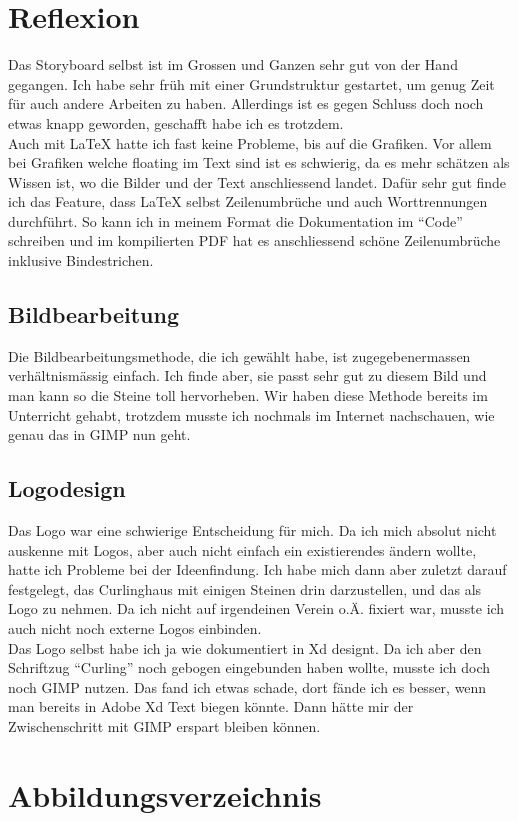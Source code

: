 \documentclass[11pt]{article}
\begin{document}
    \section{Reflexion}
    Das Storyboard selbst ist im Grossen und Ganzen sehr gut von der Hand gegangen. Ich habe sehr früh mit einer
    Grundstruktur gestartet, um genug Zeit für auch andere Arbeiten zu haben. Allerdings ist es gegen Schluss doch
    noch etwas knapp geworden, geschafft habe ich es trotzdem. \smiley
    \\Auch mit \LaTeX\xspace hatte ich fast keine Probleme, bis auf die Grafiken. Vor allem bei Grafiken welche floating
    im Text sind ist es schwierig, da es mehr schätzen als Wissen ist, wo die Bilder und der Text anschliessend
    landet. Dafür sehr gut finde ich das Feature, dass \LaTeX\xspace selbst Zeilenumbrüche und auch Worttrennungen
    durchführt. So kann ich in meinem Format die Dokumentation im ``Code'' schreiben und im kompilierten PDF hat es
    anschliessend schöne Zeilenumbrüche inklusive Bindestrichen.

    \subsection{Bildbearbeitung}
    Die Bildbearbeitungsmethode, die ich gewählt habe, ist zugegebenermassen verhältnismässig einfach. Ich finde aber,
    sie passt sehr gut zu diesem Bild und man kann so die Steine toll hervorheben. Wir haben diese Methode bereits im
    Unterricht gehabt, trotzdem musste ich nochmals im Internet nachschauen, wie genau das in GIMP nun geht.

    \subsection{Logodesign}
    Das Logo war eine schwierige Entscheidung für mich. Da ich mich absolut nicht auskenne mit Logos, aber auch nicht
    einfach ein existierendes ändern wollte, hatte ich Probleme bei der Ideenfindung. Ich habe mich dann aber zuletzt
    darauf festgelegt, das Curlinghaus mit einigen Steinen drin darzustellen, und das als Logo zu nehmen. Da ich nicht
    auf irgendeinen Verein o.Ä. fixiert war, musste ich auch nicht noch externe Logos einbinden.
    \\Das Logo selbst habe ich ja wie dokumentiert in Xd designt. Da ich aber den Schriftzug ``Curling'' noch gebogen
    eingebunden haben wollte, musste ich doch noch GIMP nutzen. Das fand ich etwas schade, dort fände ich es besser,
    wenn man bereits in Adobe Xd Text biegen könnte. Dann hätte mir der Zwischenschritt mit GIMP erspart bleiben können.

    \pagebreak
    \section{Abbildungsverzeichnis}
    \begin{appendix}
        \listoffigures
    \end{appendix}
\end{document}
